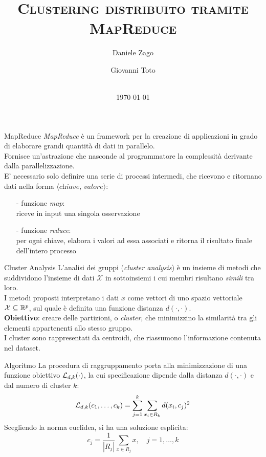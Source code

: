 \documentclass{beamer}
\title{\textsc{Clustering distribuito tramite MapReduce}}
\author{\centering Daniele Zago \and Giovanni Toto}
\date{\mbox{}\\[2cm]\today}
\begin{document}
\begin{frame}
\titlepage
\end{frame}


\begin{frame}{MapReduce}
    \emph{MapReduce} è un framework per la creazione di applicazioni in grado di elaborare grandi quantità di dati in parallelo.
    \\[.5cm]
    Fornisce un'astrazione che nasconde al programmatore la complessità derivante dalla parallelizzazione.
    \pause\\[.5cm]
    E' necessario solo definire una serie di processi intermedi, che ricevono e ritornano dati nella forma $\langle \textit{chiave, valore} \rangle$:
    \\[.5cm]
    \begin{itemize}
        \item[-] funzione \emph{map}:\\ riceve in input una singola osservazione
        \item[-] funzione \emph{reduce}:\\ per ogni chiave, elabora i valori ad essa associati e ritorna il risultato finale dell'intero processo
    \end{itemize}
\end{frame}


\begin{frame}{Cluster Analysis}
    L'analisi dei gruppi (\textit{cluster analysis}) è un insieme di metodi che suddividono l'insieme di dati $\mathcal{X}$ in sottoinsiemi i cui membri risultano \textit{simili} tra loro.
    \\[.5cm]
    I metodi proposti interpretano i dati $x$ come vettori di uno spazio vettoriale $\mathcal{X} \subseteq \mathbb{R}^{p}$, sul quale è definita una funzione distanza $d(\cdot, \cdot)$.\\[.5cm]
    \pause
    \textbf{Obiettivo}: creare delle partizioni, o \emph{cluster}, che minimizzino la similarità tra gli elementi appartenenti allo stesso gruppo.
    \\[.5cm]
    I cluster sono rappresentati da centroidi, che riassumono l'informazione contenuta nel dataset.
\end{frame}


\begin{frame}{Algoritmo \km}
    La procedura di raggruppamento porta alla minimizzazione di una funzione obiettivo $ \mathcal{L}_{d,k}(\cdot )$, la cui specificazione dipende dalla distanza $d(\cdot , \cdot )$ e dal numero di cluster $k$:
    \\[.5cm]
    \[
     \mathcal{L}_{d,k}(c_1, \ldots, c_k) = \sum_{j=1}^{k} \sum_{x_i \in R_k} d(x_i, c_j)^2 
    \]
    Scegliendo la norma euclidea, si ha una soluzione esplicita:
    \[
        c_j = \frac{1}{|R_j|}\sum_{x \in R_j} x, \quad j=1, \ldots, k
    \]
\end{frame}
\end{document}
